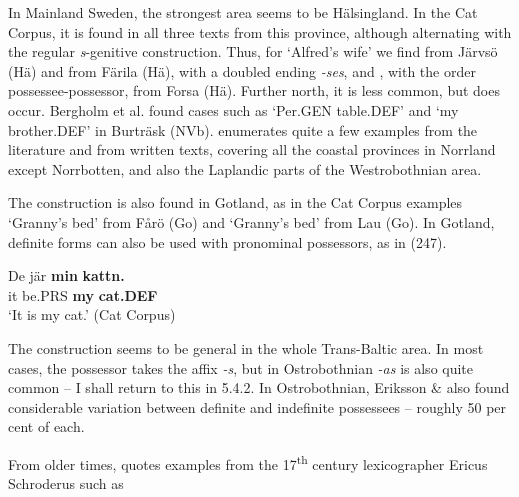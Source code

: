 In Mainland Sweden, the strongest area seems to be Hälsingland. In the Cat Corpus, it is found in all three texts from this province, although alternating with the regular \textit{s}{}-genitive construction. Thus, for ‘Alfred’s wife’ we find  from Järvsö (Hä) and  from Färila (Hä), with a doubled ending\textit{ {}-ses}, and , with the order possessee-possessor, from Forsa (Hä). Further north, it is less common, but does occur.  Bergholm et al. found cases such as ‘Per.GEN table.DEF’ and  ‘my brother.DEF’ in Burträsk (NVb). \citet[27]{Delsing2003a} enumerates quite a few examples from the literature and from written texts, covering all the coastal provinces in Norrland except Norrbotten, and also the Laplandic parts of the Westrobothnian area. 


The construction is also found in Gotland, as in the Cat Corpus examples  ‘Granny’s bed’ from Fårö (Go) and ‘Granny’s bed’ from Lau (Go). In Gotland, definite forms can also be used with pronominal possessors, as in (247).


\ea\label{}
\gll De  jär  \textbf{min} \textbf{kattn.}\\
it  be.PRS  \textbf{my} \textbf{cat.DEF}\\
\glt  ‘It is my cat.’ (Cat Corpus)
\z

The construction seems to be general in the whole Trans-Baltic area. In most cases, the possessor takes the affix\textit{ {}-s}, but in Ostrobothnian\textit{ {}-as }is also quite common – I shall return to this in 5.4.2. In Ostrobothnian, Eriksson \& \citet{Rendahl1999} also found considerable variation between definite and indefinite possessees – roughly 50 per cent of each. 


From older times, \citet[523]{Hesselman1908} quotes examples from the 17\textsuperscript{th} century lexicographer Ericus Schroderus such as

